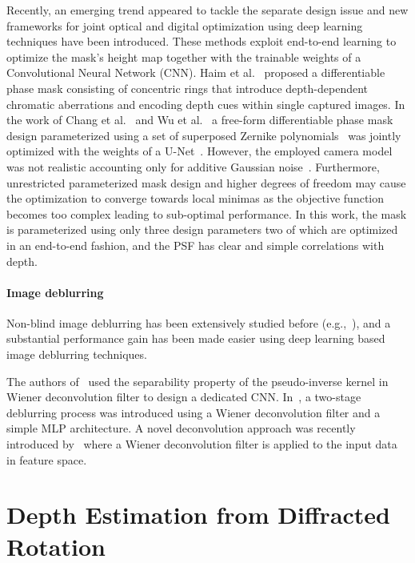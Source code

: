\documentclass[preprint,5p,twocolumn]{elsarticle}
\begin{document}
Recently, an emerging trend appeared to tackle the separate design issue and new frameworks for joint optical and digital optimization using deep learning techniques have been introduced. These methods exploit end-to-end learning to optimize the mask’s height map  together with the trainable weights of a Convolutional Neural Network (CNN). Haim et al.~\cite{haim2018depth} proposed a differentiable phase mask consisting of concentric rings that introduce depth-dependent chromatic aberrations and encoding depth cues within single captured images. In the work of Chang et al.~\cite{chang2019deep} and Wu et al.~\cite{wu2019phasecam3d} a free-form differentiable phase mask design parameterized using a set of superposed Zernike polynomials~\cite{iskander2001optimal,born2013principles} was jointly optimized with the weights of a  U-Net~\cite{ronneberger2015u}. However, the employed camera model was not realistic accounting only for additive Gaussian noise~\cite{wu2019phasecam3d}. Furthermore, unrestricted parameterized mask design and higher degrees of freedom may cause the optimization to converge towards local minimas as the objective function becomes too complex leading to sub-optimal performance. In this work, the mask is parameterized using only three design parameters two of which are optimized in an end-to-end fashion, and the PSF has clear and simple correlations with depth.

\paragraph{Image deblurring}


Non-blind image deblurring has been extensively studied before (e.g.,~\cite{anger2018modeling,cho2009fast,gong2020learning,krishnan2009fast}), and a substantial performance gain has been made easier using deep learning based image deblurring techniques.


The authors of~\cite{xu2014deep} used the separability property of the pseudo-inverse kernel in Wiener deconvolution filter to design a dedicated CNN. In~\cite{schuler2013machine}, a two-stage deblurring process was introduced using a Wiener deconvolution filter and a simple MLP architecture. A novel deconvolution approach was recently introduced by~\cite{dong2021deep} where a Wiener deconvolution filter is applied to the input data in feature space. 


 \section{Depth Estimation from Diffracted Rotation}
\label{sec:solution}
\end{document}
